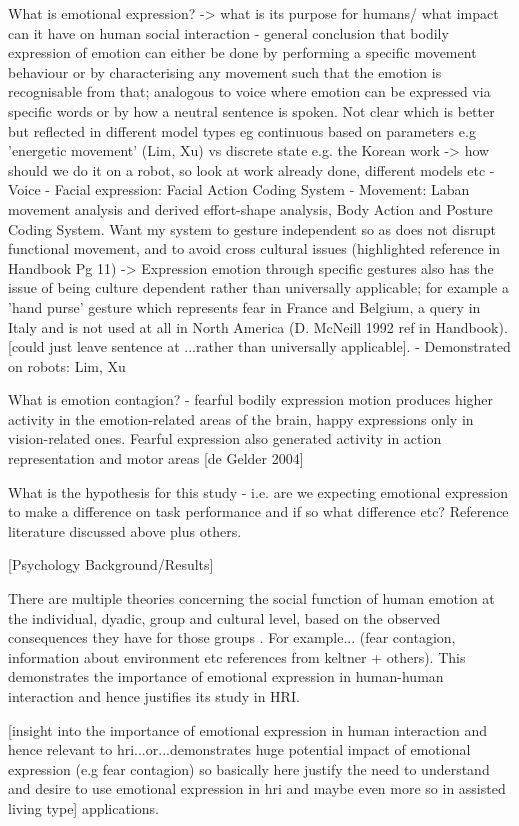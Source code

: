 \documentclass[]{article}
\begin{document}
What is emotional expression?
-> what is its purpose for humans/ what impact can it have on human social interaction
- general conclusion that bodily expression of emotion can either be done by performing a specific movement behaviour or by characterising any movement such that the emotion is recognisable from that; analogous to voice where emotion can be expressed via specific words or by how a neutral sentence is spoken. Not clear which is better but reflected in different model types eg continuous based on parameters e.g 'energetic movement' (Lim, Xu) vs discrete state e.g. the Korean work 
-> how should we do it on a robot, so look at work already done, different models etc
- Voice
- Facial expression: Facial Action Coding System
- Movement: Laban movement analysis and derived effort-shape analysis, Body Action and Posture Coding System. Want my system to gesture independent so as does not disrupt functional movement, and to avoid cross cultural issues (highlighted reference in Handbook Pg 11)
-> Expression emotion through specific gestures also has the issue of being culture dependent rather than universally applicable; for example a 'hand purse' gesture which represents fear in France and Belgium, a query in Italy and is not used at all in North America (D. McNeill 1992 ref in Handbook). [could just leave sentence at ...rather than universally applicable].  
- Demonstrated on robots: Lim, Xu

What is emotion contagion?
- fearful bodily expression motion produces higher activity in the emotion-related areas of the brain, happy expressions only in vision-related ones. Fearful expression also generated activity in action representation and motor areas [de Gelder 2004]

What is the hypothesis for this study - i.e. are we expecting emotional expression to make a difference on task performance and if so what difference etc? Reference literature discussed above plus others. 

[Psychology Background/Results]

There are multiple theories concerning the social function of human emotion at the individual, dyadic, group and cultural level, based on the observed consequences they have for those groups \cite{keltner1999social}. For example... (fear contagion, information about environment etc references from keltner + others). This demonstrates the importance of emotional expression in human-human interaction and hence justifies its study in HRI. 

[insight into the importance of emotional expression in human interaction and hence relevant to hri...or...demonstrates huge potential impact of emotional expression (e.g fear contagion) so basically here justify the need to understand and desire to use emotional expression in hri and maybe even more so in assisted living type] applications.
\end{document}
